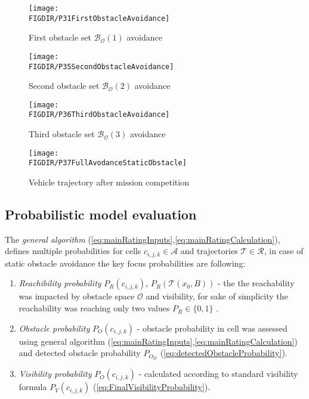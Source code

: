 \begin{figure}[H]
    \centering
    \texttt{[image: \\FIGDIR/P31FirstObstacleAvoidance]}
    \caption{First obstacle set $\mathscr{B}_\mathscr{O}(1)$ avoidance}
    \label{fig:P31FirstObstacleAvoidance}
\end{figure}

\begin{figure}[H]
    \centering
    \texttt{[image: \\FIGDIR/P35SecondObstacleAvoidance]}
    \caption{Second obstacle set $\mathscr{B}_\mathscr{O}(2)$ avoidance}
    \label{fig:P35SecondObstacleAvoidance}
\end{figure}

\begin{figure}[H]
    \centering
    \texttt{[image: \\FIGDIR/P36ThirdObstacleAvoidance]}
    \caption{Third obstacle set $\mathscr{B}_\mathscr{O}(3)$ avoidance}
    \label{fig:P36ThirdObstacleAvoidance}
\end{figure}

\begin{figure}[H]
    \centering
    \texttt{[image: \\FIGDIR/P37FullAvodanceStaticObstacle]}
    \caption{Vehicle trajectory after mission competition}
    \label{fig:P37FullAvodanceStaticObstacle}
\end{figure}

\subsection{Probabilistic model evaluation}\label{sec:probabilisticModelEvaluation}
\noindent The \emph{general algorithm} (\ref{eq:mainRatingInputs},\ref{eq:mainRatingCalculation}), defines multiple probabilities for cells $c_{i,j,k}\in\mathscr{A}$ and trajectories $\mathscr{T}\in\mathscr{R}$, in case of static obstacle avoidance the key focus probabilities are following:
\begin{enumerate}
    \item\emph{Reachibility probability} $P_{R}(c_{i,j,k})$, $P_{R}(\mathscr{T}(x_0,B))$ - the the reachability was impacted by obstacle space $\mathscr{O}$ and visibility, for sake of simplicity the reachability was reaching only two values $P_{R}\in \{0,1\}$ .
    \item\emph{Obstacle probability} $P_{O}(c_{i,j,k})$ - obstacle probability in cell was assessed using general algorithm (\ref{eq:mainRatingInputs},\ref{eq:mainRatingCalculation}) and detected obstacle probability $P_{O_D}$ (\ref{eq:detectedObstacleProbability}).
    \item\emph{Visibility probability} $P_{O}(c_{i,j,k})$ - calculated according to standard visibility formula $P_V(c_{i,j,k})$ (\ref{eq:FinalVisibilityProbability}).
\end{enumerate}


